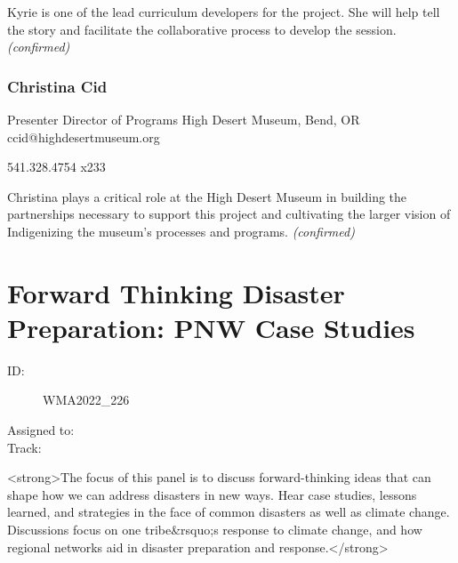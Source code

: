 \documentclass{report}
\begin{document}
                Kyrie is one of the lead curriculum developers for the project. She will help tell the story and facilitate the collaborative process to develop the session.
                \emph{ (confirmed) }
              

              
                \subsubsection*{ Christina Cid }
                Presenter\newline
                Director of Programs\newline
                High Desert Museum, Bend, OR
                \newline
                ccid@highdesertmuseum.org\newline
                
                541.328.4754 x233\newline

                Christina plays a critical role at the High Desert Museum in building the partnerships necessary to support this project and cultivating the larger vision of Indigenizing the museum's processes and programs.
                \emph{ (confirmed) }
              

              

              
        
          \newpage
          \section{ Forward Thinking Disaster Preparation: PNW Case Studies }
            \begin{description}
              \item [ID:]
              WMA2022\_226

              \item [Assigned to:]
                \item [Track:]
              \end{description}

              <strong>The focus of this panel is to discuss forward-thinking ideas that can shape how we can address disasters in new ways. Hear case studies, lessons learned, and strategies in the face of common disasters as well as climate change. Discussions focus on one tribe\&rsquo;s response to climate change, and how regional networks aid in disaster preparation and response.</strong>
\end{document}
